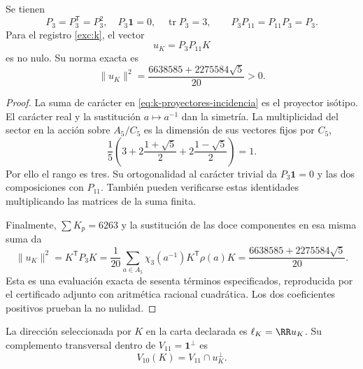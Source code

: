 \begin{lemma}
\label{lem:k-sector-no-nulo}
Se tienen
\[
 P_3=P_3^{\mathsf T}=P_3^2,\quad
 P_3\mathbf1=0,\quad \operatorname{tr}P_3=3,
 \qquad P_3P_{11}=P_{11}P_3=P_3.
\]
Para el registro \eqref{exc:k}, el vector
\begin{equation}
 u_K=P_3P_{11}K
 \label{eq:k-vector-direccional}
\end{equation}
es no nulo. Su norma exacta es
\begin{equation}
 \lVert u_K\rVert^2
 =\frac{6638585+2275584\sqrt5}{20}>0.
 \label{eq:k-norma-direccion}
\end{equation}
\end{lemma}
\begin{proof}
La suma de carácter en \eqref{eq:k-proyectores-incidencia} es el
proyector isótipo. El carácter real y la sustitución \(a\mapsto a^{-1}\)
dan la simetría. La multiplicidad del sector en la acción sobre
\(A_5/C_5\) es la dimensión de sus vectores fijos por \(C_5\),
\[
 \frac15\left(3+2\frac{1+\sqrt5}{2}
                 +2\frac{1-\sqrt5}{2}\right)=1.
\]
Por ello el rango es tres. Su ortogonalidad al carácter trivial
da \(P_3\mathbf1=0\) y las dos composiciones con \(P_{11}\).
También pueden verificarse estas identidades multiplicando las
matrices de la suma finita.

Finalmente, \(\sum K_p=6263\) y la sustitución de las doce
componentes en esa misma suma da
\[
 \lVert u_K\rVert^2=K^{\mathsf T}P_3K
 =\frac1{20}\sum_{a\in A_5}
                \chi_3(a^{-1})K^{\mathsf T}\rho(a)K
 =\frac{6638585+2275584\sqrt5}{20}.
\]
Esta es una evaluación exacta de sesenta términos especificados,
reproducida por el certificado adjunto con aritmética racional
cuadrática. Los dos coeficientes positivos prueban la no nulidad.
\end{proof}

\begin{definition}
La dirección seleccionada por \(K\) en la carta declarada es
\(\ell_K=\RR u_K\). Su complemento transversal dentro de
\(V_{11}=\mathbf1^\perp\) es
\[
 V_{10}(K)=V_{11}\cap u_K^\perp.
\]
\end{definition}

